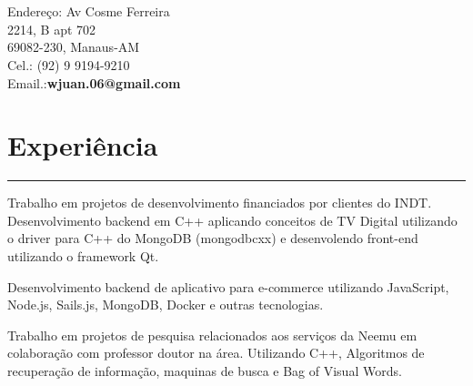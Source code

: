 \documentclass[]{rahulworld-resume}
\begin{document}
\begin{minipage}[t]{0.66\textwidth} 
\hspace*{0pt}\hfill    \\
\hspace*{0pt}\hfill    \\
\hspace*{0pt}\hfill Endereço: Av Cosme Ferreira \\
\hspace*{0pt}\hfill 2214, B apt 702 \\
\hspace*{0pt}\hfill 69082-230, Manaus-AM \\
\hspace*{0pt}\hfill Cel.: (92) 9 9194-9210 \\
\hspace*{0pt}\hfill Email.:\textbf{wjuan.06@gmail.com} \\
\section{Experiência}
\noindent\rule{12.5cm}{0.4pt}
 
\noindent
\hspace{5em}%
\begin{minipage}{0.85\textwidth\vspace{2pt}}
Trabalho em projetos de desenvolvimento financiados por clientes do INDT. 
Desenvolvimento backend em C++ aplicando conceitos de TV Digital utilizando o driver para C++ do MongoDB (mongodbcxx) e desenvolendo front-end utilizando o framework Qt. 
\end{minipage}
\sectionsep

 
\noindent
\hspace{5em}%
\begin{minipage}{0.85\textwidth\vspace{2pt}}
Desenvolvimento backend de aplicativo para e-commerce utilizando JavaScript, Node.js, Sails.js, MongoDB, Docker e outras tecnologias.
\end{minipage}
\sectionsep

 
\noindent
\hspace{5em}%
\begin{minipage}{0.85\textwidth\vspace{2pt}}
Trabalho em projetos de pesquisa relacionados aos serviços da Neemu em colaboração com professor doutor na área. Utilizando C++, Algoritmos de recuperação de informação, maquinas de busca e Bag of Visual Words. 
\end{minipage}

\end{minipage}
\end{document}
